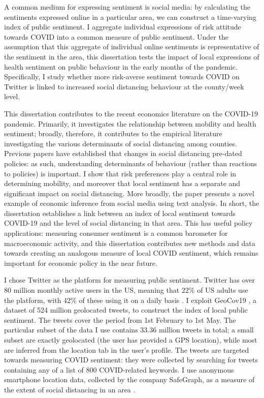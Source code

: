 \documentclass[12pt,a4]{article}
\begin{document}
A common medium for expressing sentiment is social media: by calculating the sentiments expressed online in a particular area, we can construct a time-varying index of public sentiment. I aggregate individual expressions of risk attitude towards COVID into a common measure of public sentiment. Under the assumption that this aggregate of individual online sentiments is representative of the sentiment in the area, this dissertation tests the impact of local expressions of health sentiment on public behaviour in the early months of the pandemic. Specifically, I study whether more risk-averse sentiment towards COVID on Twitter is linked to increased social distancing behaviour at the county/week level. 

This dissertation contributes to the recent economics literature on the COVID-19 pandemic. Primarily, it investigates the relationship between mobility and health sentiment; broadly, therefore, it contributes to the empirical literature investigating the various determinants of social distancing among counties. Previous papers have established that changes in social distancing pre-dated policies: as such, understanding determinants of behaviour (rather than reactions to policies) is important. I show that risk preferences play a central role in determining mobility, and moreover that local sentiment has a separate and significant impact on social distancing. More broadly, the paper presents a novel example of economic inference from social media using text analysis. In short, the dissertation establishes a link between an index of local sentiment towards COVID-19 and the level of social distancing in that area. This has useful policy applications: measuring consumer sentiment is a common barometer for macroeconomic activity, and this dissertation contributes new methods and data towards creating an analogous measure of local COVID sentiment, which remains important for economic policy in the near future.

I chose Twitter as the platform for measuring public sentiment. Twitter has over 80 million monthly active users in the US, meaning that 22\% of US adults use the platform, with 42\% of these using it on a daily basis \parencite{perrinShareAdultsUsing2019}. I exploit GeoCov19 \parencite{qaziGeoCoV19DatasetHundreds2020a}, a dataset of 524 million geolocated tweets, to construct the index of local public sentiment. The tweets cover the period from 1st February to 1st May. The particular subset of the data I use contains 33.36 million tweets in total; a small subset are exactly geolocated (the user has provided a GPS location), while most are inferred from the location tab in the user's profile. The tweets are targeted towards measuring COVID sentiment: they were collected by searching for tweets containing any of a list of 800 COVID-related keywords. I use anonymous smartphone location data, collected by the company SafeGraph, as a measure of the extent of social distancing in an area \parencite{safegraphinc.SocialDistancingMetrics2020}.
\end{document}
